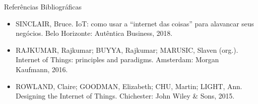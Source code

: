
\begin{frame}{Referências Bibliográficas}
    \begin{itemize}
        \item SINCLAIR, Bruce. IoT: como usar a “internet das coisas” para alavancar seus negócios. Belo Horizonte: Autêntica Business, 2018.
        \item RAJKUMAR, Rajkumar; BUYYA, Rajkumar; MARUSIC, Slaven (org.). Internet of Things: principles and paradigms. Amsterdam: Morgan Kaufmann, 2016.
        \item ROWLAND, Claire; GOODMAN, Elizabeth; CHU, Martin; LIGHT, Ann. Designing the Internet of Things. Chichester: John Wiley & Sons, 2015.
    \end{itemize}
\end{frame}